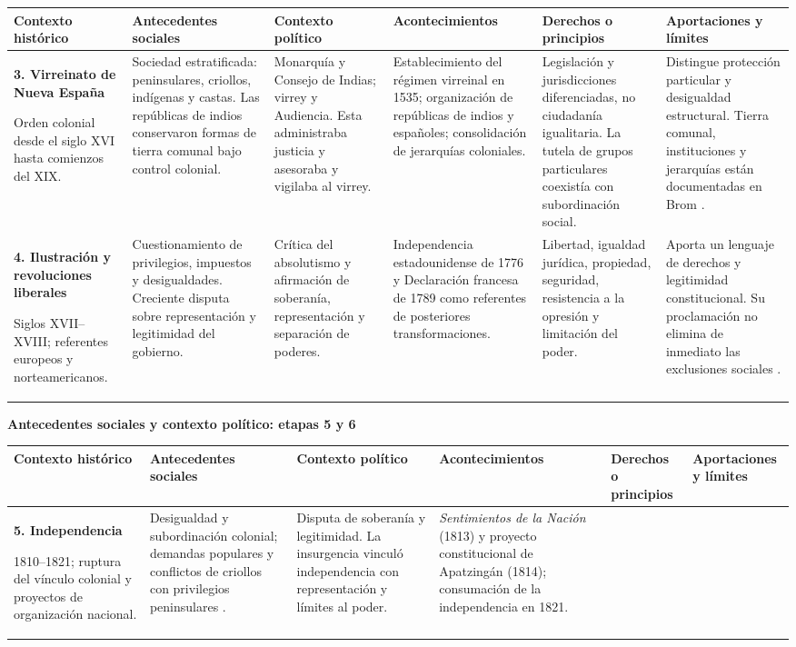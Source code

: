 \documentclass[12pt,spanish,letterpaper,oneside]{article}
\newcommand{\encabezado}{\rowcolor{cabecera}\textbf{Contexto hist\'orico}&\textbf{Antecedentes sociales}&\textbf{Contexto pol\'itico}&\textbf{Acontecimientos}&\textbf{Derechos o principios}&\textbf{Aportaciones y l\'imites}\\\hline}
\begin{document}
\begin{landscape}
\begin{tabularx}{\linewidth}{|Y|Y|Y|Y|Y|Y|}
\hline\encabezado
\textbf{3. Virreinato de Nueva Espa\~na}\par Orden colonial desde el siglo XVI hasta comienzos del XIX.
& Sociedad estratificada: peninsulares, criollos, ind\'igenas y castas. Las rep\'ublicas de indios conservaron formas de tierra comunal bajo control colonial.
& Monarqu\'ia y Consejo de Indias; virrey y Audiencia. Esta administraba justicia y asesoraba y vigilaba al virrey.
& Establecimiento del r\'egimen virreinal en 1535; organizaci\'on de rep\'ublicas de indios y espa\~noles; consolidaci\'on de jerarqu\'ias coloniales.
& Legislaci\'on y jurisdicciones diferenciadas, no ciudadan\'ia igualitaria. La tutela de grupos particulares coexist\'ia con subordinaci\'on social.
& Distingue protecci\'on particular y desigualdad estructural. Tierra comunal, instituciones y jerarqu\'ias est\'an documentadas en Brom \citep[caps.~5--6]{brom2017}.\\\hline
\textbf{4. Ilustraci\'on y revoluciones liberales}\par Siglos XVII--XVIII; referentes europeos y norteamericanos.
& Cuestionamiento de privilegios, impuestos y desigualdades. Creciente disputa sobre representaci\'on y legitimidad del gobierno.
& Cr\'itica del absolutismo y afirmaci\'on de soberan\'ia, representaci\'on y separaci\'on de poderes.
& Independencia estadounidense de 1776 y Declaraci\'on francesa de 1789 como referentes de posteriores transformaciones.
& Libertad, igualdad jur\'idica, propiedad, seguridad, resistencia a la opresi\'on y limitaci\'on del poder.
& Aporta un lenguaje de derechos y legitimidad constitucional. Su proclamaci\'on no elimina de inmediato las exclusiones sociales \citep[pp.~11--13]{alvarez2009}.\\\hline
\end{tabularx}
\clearpage
\noindent\textbf{Antecedentes sociales y contexto pol\'itico: etapas 5 y 6}\par\medskip
\begin{tabularx}{\linewidth}{|Y|Y|Y|Y|Y|Y|}
\hline\encabezado
\textbf{5. Independencia}\par 1810--1821; ruptura del v\'inculo colonial y proyectos de organizaci\'on nacional.
& Desigualdad y subordinaci\'on colonial; demandas populares y conflictos de criollos con privilegios peninsulares \citep[p.~73]{delgado2010}.
& Disputa de soberan\'ia y legitimidad. La insurgencia vincul\'o independencia con representaci\'on y l\'imites al poder.
& \emph{Sentimientos de la Naci\'on} (1813) y proyecto constitucional de Apatzing\'an (1814); consumaci\'on de la independencia en 1821.

\end{tabularx}
\end{landscape}
\end{document}
